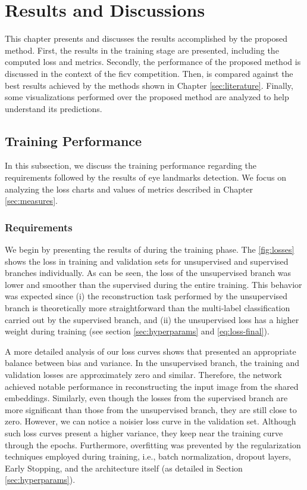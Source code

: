 \section{Results and Discussions} \label{sec:results}
 
This chapter presents and discusses the results accomplished by the proposed method. First, the \methodname results in the training stage are presented, including the computed loss and metrics. Secondly, the performance of the proposed method is discussed in the context of the \acs{ficv} competition. Then, \methodname is compared against the best results achieved by the methods shown in Chapter \ref{sec:literature}. Finally, some visualizations performed over the proposed method are analyzed to help understand its predictions.
 
\subsection{Training Performance}
 
In this subsection, we discuss the training performance regarding the \icao requirements followed by the results of eye landmarks detection. We focus on analyzing the loss charts and values of metrics described in Chapter \ref{sec:measures}.
 
\subsubsection{Requirements}
 
We begin by presenting the results of \methodname during the training phase. The \autoref{fig:losses} shows the loss in training and validation sets for unsupervised and supervised branches individually. As can be seen, the loss of the unsupervised branch was lower and smoother than the supervised during the entire training. This behavior was expected since (i) the reconstruction task performed by the unsupervised branch is theoretically more straightforward than the multi-label classification carried out by the supervised branch, and (ii) the unsupervised loss has a higher weight during training (see section \ref{sec:hyperparams} and \autoref{eq:loss-final}). 
 
A more detailed analysis of our loss curves shows that \methodname presented an appropriate balance between bias and variance. In the unsupervised branch, the training and validation losses are approximately zero and similar. Therefore, the network achieved notable performance in reconstructing the input image from the shared embeddings. Similarly, even though the losses from the supervised branch are more significant than those from the unsupervised branch, they are still close to zero. However, we can notice a noisier loss curve in the validation set. Although such loss curves present a higher variance, they keep near the training curve through the epochs. Furthermore, overfitting was prevented by the regularization techniques employed during training, i.e., batch normalization, dropout layers, Early Stopping, and the architecture itself (as detailed in Section \ref{sec:hyperparams}).
 
